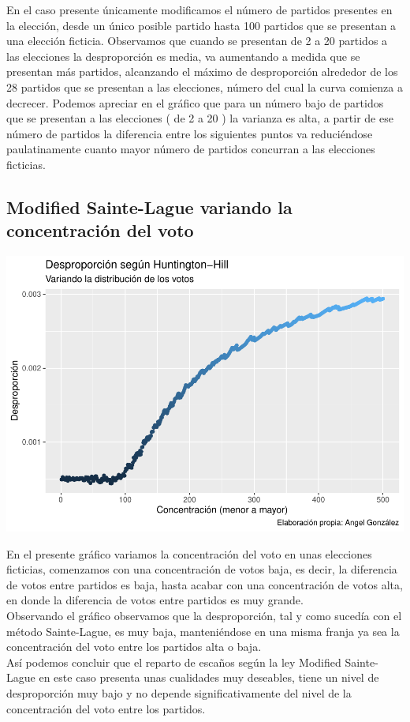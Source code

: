 \documentclass[12pt,a4paper,]{book}
\numberwithin{dummy}{section}
\theoremstyle{ocrenumbox}
\theoremstyle{blacknumex}
\theoremstyle{blacknumbox}
\theoremstyle{ocrenum}
\theoremstyle{ocrenum}
\begin{document}
En el caso presente únicamente modificamos el número de partidos
presentes en la elección, desde un único posible partido hasta 100
partidos que se presentan a una elección ficticia. Observamos que cuando
se presentan de 2 a 20 partidos a las elecciones la desproporción es
media, va aumentando a medida que se presentan más partidos, alcanzando
el máximo de desproporción alrededor de los 28 partidos que se presentan
a las elecciones, número del cual la curva comienza a decrecer. Podemos
apreciar en el gráfico que para un número bajo de partidos que se
presentan a las elecciones ( de 2 a 20 ) la varianza es alta, a partir
de ese número de partidos la diferencia entre los siguientes puntos va
reduciéndose paulatinamente cuanto mayor número de partidos concurran a
las elecciones ficticias.

\hypertarget{modified-sainte-lague-variando-la-concentraciuxf3n-del-voto}{%
\subsection{Modified Sainte-Lague variando la concentración del
voto}\label{modified-sainte-lague-variando-la-concentraciuxf3n-del-voto}}

\begin{center}\includegraphics[width=0.95\linewidth]{figurasR/unnamed-chunk-28-1} \end{center}

En el presente gráfico variamos la concentración del voto en unas
elecciones ficticias, comenzamos con una concentración de votos baja, es
decir, la diferencia de votos entre partidos es baja, hasta acabar con
una concentración de votos alta, en donde la diferencia de votos entre
partidos es muy grande.\\
Observando el gráfico observamos que la desproporción, tal y como
sucedía con el método Sainte-Lague, es muy baja, manteniéndose en una
misma franja ya sea la concentración del voto entre los partidos alta o
baja.\\
Así podemos concluir que el reparto de escaños según la ley Modified
Sainte-Lague en este caso presenta unas cualidades muy deseables, tiene
un nivel de desproporción muy bajo y no depende significativamente del
nivel de la concentración del voto entre los partidos.
\end{document}
